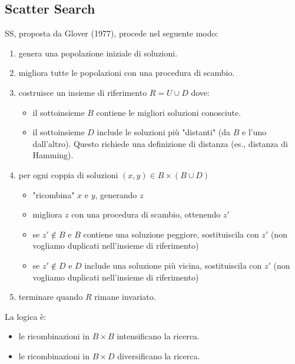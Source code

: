 \documentclass{article}
\begin{document}
\subsection{Scatter Search}
SS, proposta da Glover (1977), procede nel seguente modo:
\begin{enumerate}
    \item genera una popolazione iniziale di soluzioni.
    \item migliora tutte le popolazioni con una procedura di scambio.
    \item costruisce un insieme di riferimento $R=U\cup D$ dove:
    \begin{itemize}
        \item il sottoinsieme $B$ contiene le migliori soluzioni conosciute.
        \item il sottoinsieme $D$ include le soluzioni più "distanti" (da $B$ e l'uno dall'altro).
        Questo richiede una definizione di distanza (es., distanza di Hamming).
    \end{itemize}
    \item per ogni coppia di soluzioni $(x,y)\in B\times (B\cup D)$
    \begin{itemize}
        \item "ricombina" $x$ e $y$, generando $z$
        \item migliora $z$ con una procedura di scambio, ottenendo $z'$
        \item se $z'\notin B$ e $B$ contiene una soluzione peggiore, sostituiscila con $z'$
        (non vogliamo duplicati nell'insieme di riferimento)
        \item se $z'\notin D$ e $D$ include una soluzione più vicina, sostituiscila con $z'$
        (non vogliamo duplicati nell'insieme di riferimento)
    \end{itemize}
    \item terminare quando $R$ rimane invariato.
\end{enumerate}
La logica è:
\begin{itemize}
    \item le ricombinazioni in $B\times B$ intensificano la ricerca.
    \item le ricombinazioni in $B\times D$ diversificano la ricerca.
\end{itemize}
\end{document}
